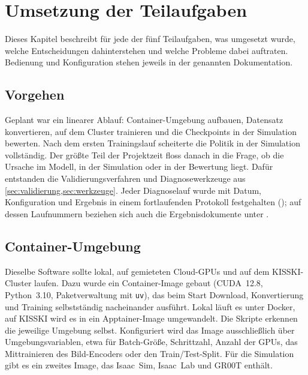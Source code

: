 
\chapter{Umsetzung der Teilaufgaben}
\label{chap:umsetzung}
\label{chap:methoden}

Dieses Kapitel beschreibt für jede der fünf Teilaufgaben, was umgesetzt wurde,
welche Entscheidungen dahinterstehen und welche Probleme dabei auftraten.
Bedienung und Konfiguration stehen jeweils in der genannten Dokumentation.

\section{Vorgehen}
\label{sec:vorgehen}

Geplant war ein linearer Ablauf: Container-Umgebung aufbauen, Datensatz
konvertieren, auf dem Cluster trainieren und die Checkpoints in der Simulation
bewerten. Nach dem ersten Trainingslauf scheiterte die Politik in der
Simulation vollständig. Der größte Teil der Projektzeit floss danach in die
Frage, ob die Ursache im Modell, in der Simulation oder in der Bewertung
liegt. Dafür entstanden die Validierungsverfahren und Diagnosewerkzeuge aus
\cref{sec:validierung,sec:werkzeuge}. Jeder Diagnoselauf wurde mit Datum,
Konfiguration und Ergebnis in einem fortlaufenden Protokoll festgehalten
(); auf dessen Laufnummern beziehen
sich auch die Ergebnisdokumente unter .

\section{Container-Umgebung}
\label{sec:infrastruktur}
\label{sec:docker}

Dieselbe Software sollte lokal, auf gemieteten Cloud-GPUs und auf dem
KISSKI-Cluster laufen. Dazu wurde ein Container-Image gebaut (CUDA~12.8,
Python~3.10, Paketverwaltung mit \texttt{uv}), das beim Start Download,
Konvertierung und Training selbstständig nacheinander ausführt. Lokal läuft es
unter Docker, auf KISSKI wird es in ein Apptainer-Image umgewandelt. Die
Skripte erkennen die jeweilige Umgebung selbst. Konfiguriert wird das Image
ausschließlich über Umgebungsvariablen, etwa für Batch-Größe, Schrittzahl,
Anzahl der GPUs, das Mittrainieren des Bild-Encoders oder den
Train/Test-Split. Für die Simulation gibt es ein zweites Image, das Isaac~Sim,
Isaac~Lab und GR00T enthält.

